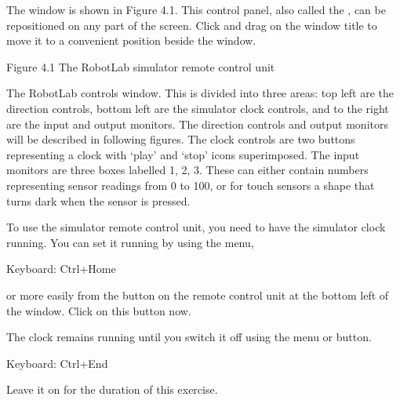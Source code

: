 \documentclass[letterpaper,10pt,english]{sphinxmanual}
\begin{document}
The  window is shown in Figure 4.1. This control panel, also called the , can be repositioned on any part of the screen. Click and drag on the  window title to move it to a convenient position beside the  window.

\noindent{}

Figure 4.1 The RobotLab simulator remote control unit

The RobotLab controls window. This is divided into three areas: top left are the direction controls, bottom left are the simulator clock controls, and to the right are the input and output monitors. The direction controls and output monitors will be described in following figures. The clock controls are two buttons representing a clock with ‘play’ and ‘stop’ icons superimposed. The input monitors are three boxes labelled 1, 2, 3. These can either contain numbers representing sensor readings from
0 to 100, or for touch sensors a shape that turns dark when the sensor is pressed.

To use the simulator remote control unit, you need to have the simulator clock running. You can set it running by using the  menu,





Keyboard: Ctrl+Home





or more easily from the   button on the remote control unit at the bottom left of the  window. Click on this button now.

The clock remains running until you switch it off using the  menu or  button.





Keyboard: Ctrl+End





Leave it on for the duration of this exercise.
\end{document}
